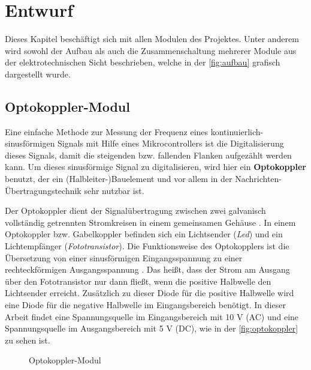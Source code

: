 \chapter{Entwurf}\label{chapter:entwurf}

Dieses Kapitel beschäftigt sich mit allen Modulen des Projektes. Unter anderem wird sowohl der Aufbau als auch die Zusammenschaltung mehrerer Module aus der elektrotechnischen Sicht beschrieben, welche in der \autoref{fig:aufbau} grafisch dargestellt wurde.

\section{Optokoppler-Modul}

Eine einfache Methode zur Messung der Frequenz eines kontinuierlich-sinusförmigen Signals mit Hilfe eines Mikrocontrollers ist die Digitalisierung dieses Signals, damit die steigenden bzw. fallenden Flanken aufgezählt werden kann. Um dieses sinusförmige Signal zu digitalisieren, wird hier ein \textbf{Optokoppler} benutzt, der ein (Halbleiter-)Bauelement und vor allem in der Nachrichten-Übertragungstechnik sehr nutzbar ist. \smallskip \smallskip

Der Optokoppler dient der Signalübertragung zwischen zwei galvanisch vollständig getrennten Stromkreisen in einem gemeinsamen Gehäuse \cite{Mikrocontroller:Optokoppler}. In einem Optokoppler bzw. Gabelkoppler befinden sich ein Lichtsender (\textit{Led}) und ein Lichtempfänger (\textit{Fototransistor}). Die Funktionsweise des Optokopplers ist die Übersetzung von einer sinusförmigen Eingangsspannung zu einer rechteckförmigen Ausgangsspannung \cite{Tietze2002}. Das heißt, dass der Strom am Ausgang über den Fototransistor nur dann fließt, wenn die positive Halbwelle den Lichtsender erreicht. Zusätzlich zu dieser Diode für die positive Halbwelle wird eine Diode für die negative Halbwelle im Eingangsbereich benötigt. In dieser Arbeit findet eine Spannungsquelle im Eingangsbereich mit 10 V (AC) und eine Spannungsquelle im Ausgangsbereich mit 5 V (DC), wie in der \autoref{fig:optokoppler} zu sehen ist.  

\begin{figure}[htbp]
	\centering
	\caption{Optokoppler-Modul}\label{fig:optokoppler}
\end{figure}

